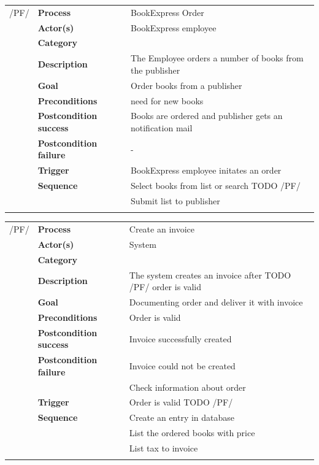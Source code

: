 \documentclass[11pt,a4paper,oneside,svgnames]{report}
\begin{document}
\noindent
\begin{tabular}{p{1.5cm}p{3cm}p{8cm}}
/PF/	& \textbf{Process} & BookExpress Order\\
		& \textbf{Actor(s)} & BookExpress employee\\
		& \textbf{Category} & \\
		& \textbf{Description}	 & The Employee orders a number of books from the publisher\\
		& \textbf{Goal} & Order books from a publisher\\
		& \textbf{Preconditions} & need for new books\\
		& \textbf{Postcondition success} & Books are ordered and publisher gets an notification mail\\
		& \textbf{Postcondition failure} & -\\
		& \textbf{Trigger} & BookExpress employee initates an order\\
		& \textbf{Sequence} & Select books from list or search TODO /PF/\\
		& & Submit list to publisher\\
		
\hfill \\
\end{tabular}

\noindent
\begin{tabular}{p{1.5cm}p{3cm}p{8cm}}
/PF/	& \textbf{Process} & Create an invoice\\
		& \textbf{Actor(s)} & System\\
		& \textbf{Category} & \\
		& \textbf{Description}	 & The system creates an invoice after TODO /PF/ order is valid\\
		& \textbf{Goal} & Documenting order and deliver it with invoice\\
		& \textbf{Preconditions} & Order is valid\\
		& \textbf{Postcondition success} & Invoice successfully created\\
		& \textbf{Postcondition failure} & Invoice could not be created\\
		& & Check information about order\\
		& \textbf{Trigger} & Order is valid TODO /PF/\\
		& \textbf{Sequence} & Create an entry in database\\
		& & List the ordered books with price\\
		& & List tax to invoice\\
		
\hfill \\
\end{tabular}
\end{document}
